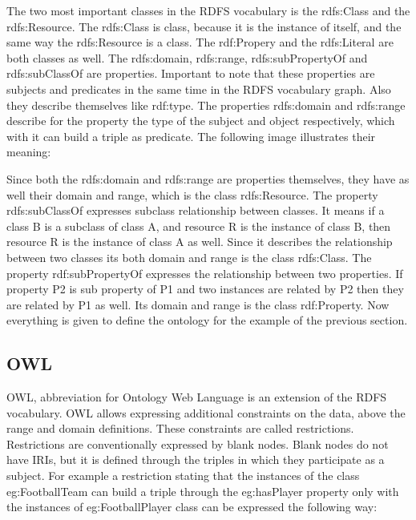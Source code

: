 
The two most important classes in the RDFS vocabulary is the rdfs:Class and the rdfs:Resource. The rdfs:Class is class, because it is the instance of itself, and the same way the rdfs:Resource is a class. The rdf:Propery and the rdfs:Literal are both classes as well. The rdfs:domain, rdfs:range, rdfs:subPropertyOf and rdfs:subClassOf are properties. Important to note that these properties are subjects and predicates in the same time in the RDFS vocabulary graph. Also they describe themselves like rdf:type.
The properties rdfs:domain and rdfs:range describe for the property the type of the subject and object respectively, which with it can build a triple as predicate. The following image illustrates their meaning:


Since both the rdfs:domain and rdfs:range are properties themselves, they have as well their domain and range, which is the class rdfs:Resource. 
The property rdfs:subClassOf expresses subclass relationship between classes. It means if a class B is a subclass of class A, and resource R is the instance of class B, then resource R is the instance of class A as well. Since it describes the relationship between two classes its both domain and range is the class rdfs:Class. 
The property rdf:subPropertyOf expresses the relationship between two properties. If property P2 is sub property of P1 and two instances are related by P2 then they are related by P1 as well. Its domain and range is the class  rdf:Property.
Now everything is given to define the ontology for the example of the previous section.



\subsection{OWL}

OWL, abbreviation for Ontology Web Language is an extension of the RDFS vocabulary. OWL allows expressing additional constraints on the data, above the range and domain definitions. These constraints are called restrictions. Restrictions are conventionally expressed by blank nodes. Blank nodes do not have IRIs, but it is defined through the triples in which they participate as a subject. For example a restriction stating that the instances of the class eg:FootballTeam can build a triple through the eg:hasPlayer property only with the instances of eg:FootballPlayer class can be expressed the following way:

